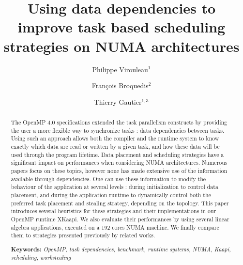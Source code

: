\documentclass{Styles/llncs}
\begin{document}
\title{Using data dependencies to improve task based scheduling strategies on NUMA architectures}
\author{
  Philippe Virouleau$^1$ \and François Broquedis$^2$ \and Thierry Gautier$^{1,3}$
 \vspace*{-1ex}}
\date{}
\maketitle

\begin{abstract}
  \vspace*{-5ex} The OpenMP 4.0 specifications extended the task parallelism
  constructs by providing the user a more flexible way to synchronize tasks :
  data dependencies between tasks.
  Using such an approach allows both the compiler and the runtime system
  to know exactly which data are read or written by a given task, and how these
  data will be used through the program lifetime.  Data placement and scheduling
  strategies have a significant impact on performances when considering
  NUMA architectures.  Numerous papers focus on these topics, however none
  has made extensive use of the information available through dependencies.
  One can use these information to modify the behaviour of the application at
  several levels : during initialization to control data placement,
  and during the application runtime to dynamically control both the preferred
  task placement and stealing strategy, depending on the topology.
  This paper introduces several heuristics for these strategies and their
  implementations in our OpenMP runtime XKaapi.
  We also evaluate their performances by using several linear algebra
  applications, executed on a 192 cores NUMA machine. We finally
  compare them to strategies presented previously by related works.

\smallskip
  \noindent\textbf{Keywords:}
  \emph{
    OpenMP, task dependencies, benchmark, runtime systems, NUMA, Kaapi, scheduling, workstealing
  }
\end{abstract}
\end{document}
